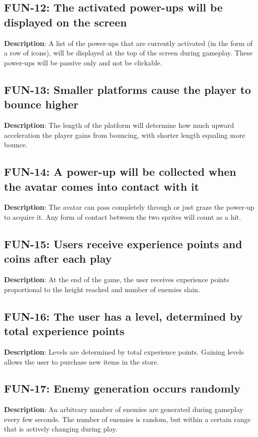 \subsection{FUN-12: The activated power-ups will be displayed on the screen}
\textbf{Description}: A list of the power-ups that are currently activated
(in the form of a row of icons), will be displayed at the top of the
screen during gameplay. These power-ups will be passive only and not
be clickable.

\subsection{FUN-13: Smaller platforms cause the player to bounce higher}
\textbf{Description}: The length of the platform will determine how
much upward acceleration the player gains from bouncing, with shorter
length equaling more bounce.

\subsection{FUN-14: A power-up will be collected when the avatar comes into 
contact with it}
\textbf{Description}: The avatar can pass completely through or just
graze the power-up to acquire it. Any form of contact between the
two sprites will count as a hit.

\subsection{FUN-15: Users receive experience points and coins after each play}
\textbf{Description}: At the end of the game, the user receives experience
points proportional to the height reached and number of enemies slain.

\subsection{FUN-16: The user has a level, determined by total experience points}
\textbf{Description}: Levels are determined by total experience points.
Gaining levels allows the user to purchase new items in the store.

\subsection{FUN-17: Enemy generation occurs randomly}
\textbf{Description}: An arbitrary number of enemies are generated
during gameplay every few seconds. The number of enemies is random,
but within a certain range that is actively changing during play. 

